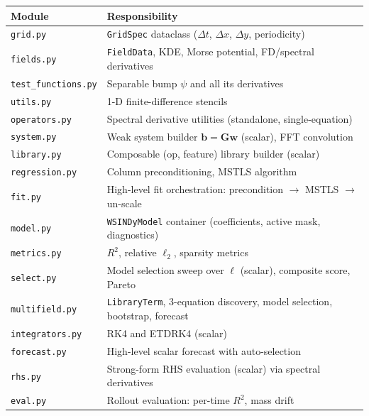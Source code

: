 \documentclass[11pt, letterpaper]{article}
\theoremstyle{definition}
\newcommand{\vw}{\mathbf{w}}
\newcommand{\vb}{\mathbf{b}}
\newcommand{\vG}{\mathbf{G}}
\begin{document}
\begin{center}
\renewcommand{\arraystretch}{1.25}
\begin{tabular}{lp{8cm}}
  \toprule
  \textbf{Module} & \textbf{Responsibility} \\
  \midrule
  \texttt{grid.py}           & \texttt{GridSpec} dataclass ($\Delta t$, $\Delta x$, $\Delta y$, periodicity) \\
  \texttt{fields.py}         & \texttt{FieldData}, KDE, Morse potential, FD/spectral derivatives \\
  \texttt{test\_functions.py} & Separable bump $\psi$ and all its derivatives \\
  \texttt{utils.py}          & 1-D finite-difference stencils \\
  \texttt{operators.py}      & Spectral derivative utilities (standalone, single-equation) \\
  \texttt{system.py}         & Weak system builder $\vb = \vG\vw$ (scalar), FFT convolution \\
  \texttt{library.py}        & Composable (op, feature) library builder (scalar) \\
  \texttt{regression.py}     & Column preconditioning, MSTLS algorithm \\
  \texttt{fit.py}            & High-level fit orchestration: precondition $\to$ MSTLS $\to$ un-scale \\
  \texttt{model.py}          & \texttt{WSINDyModel} container (coefficients, active mask, diagnostics) \\
  \texttt{metrics.py}        & $R^{2}$, relative $\ell_2$, sparsity metrics \\
  \texttt{select.py}         & Model selection sweep over $\bm\ell$ (scalar), composite score, Pareto \\
  \texttt{multifield.py}     & \texttt{LibraryTerm}, 3-equation discovery, model selection, bootstrap, forecast \\
  \texttt{integrators.py}    & RK4 and ETDRK4 (scalar) \\
  \texttt{forecast.py}       & High-level scalar forecast with auto-selection \\
  \texttt{rhs.py}            & Strong-form RHS evaluation (scalar) via spectral derivatives \\
  \texttt{eval.py}           & Rollout evaluation: per-time $R^{2}$, mass drift \\
  \bottomrule
\end{tabular}
\end{center}
\end{document}
